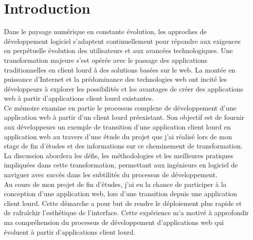 \documentclass[a4paper, 12pt, french]{article}
\begin{document}
	\newpage
		
	
	\listoffigures
	

	\listoftables
	\newpage

	\printglossary

	\newpage
	

	\section*{Introduction}%
		Dans le paysage numérique en constante évolution, les approches de développement logiciel s'adaptent continuellement pour répondre aux exigences en perpétuelle évolution des utilisateurs et aux avancées technologiques. Une transformation majeure s'est opérée avec le passage des applications traditionnelles en client lourd à des solutions basées sur le web. La montée en puissance d'Internet et la prédominance des technologies web ont incité les développeurs à explorer les possibilités et les avantages de créer des applications web à partir d'applications client lourd existantes.\\

		Ce mémoire examine en partie le processus complexe de développement d'une application web à partir d'un client lourd préexistant. Son objectif est de fournir aux développeurs un exemple de transition d'une application client lourd en application web au travers d'une étude du projet que j'ai réalisé lors de mon stage de fin d'études et des informations sur ce cheminement de transformation. La discussion abordera les défis, les méthodologies et les meilleures pratiques impliquées dans cette transformation, permettant aux ingénieurs en logiciel de naviguer avec succès dans les subtilités du processus de développement.\\

		Au cours de mon projet de fin d'études, j'ai eu la chance de participer à la conception d'une application web, lors d'une transition depuis une application client lourd. Cette démarche a pour but de rendre le déploiement plus rapide et de rafraîchir l'esthétique de l'interface. Cette expérience m'a motivé à approfondir ma compréhension du processus de développement d'applications web qui évoluent à partir d'applications client lourd.\\
		
\end{document}
